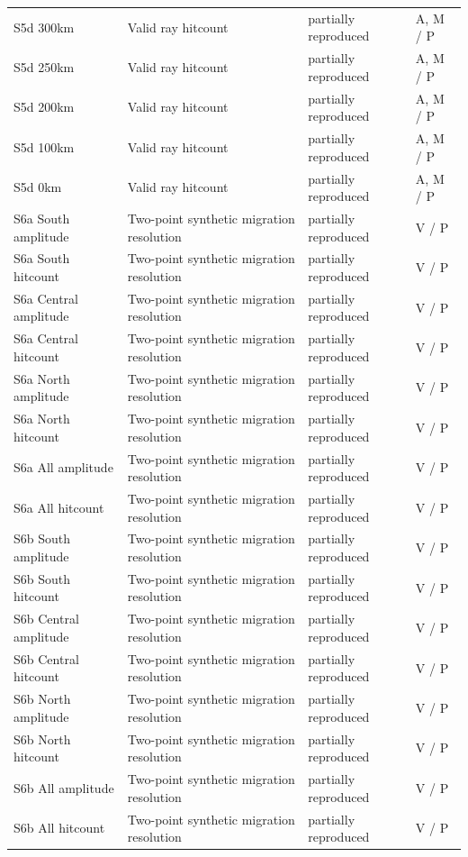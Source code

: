 \documentclass[10pt]{article}
\begin{document}
\begin{longtable}{p{.23\linewidth}p{.25\linewidth}p{.19\linewidth}p{.22\linewidth}}
S5d 300km & Valid ray hitcount & partially reproduced & A, M / P \\
S5d 250km & Valid ray hitcount & partially reproduced & A, M / P \\
S5d 200km & Valid ray hitcount & partially reproduced & A, M / P \\
S5d 100km & Valid ray hitcount & partially reproduced & A, M / P \\
S5d 0km & Valid ray hitcount & partially reproduced & A, M / P \\
S6a South amplitude & Two-point synthetic migration resolution & partially reproduced & V / P \\
S6a South hitcount & Two-point synthetic migration resolution & partially reproduced & V / P \\
S6a Central amplitude & Two-point synthetic migration resolution & partially reproduced & V / P \\
S6a Central hitcount & Two-point synthetic migration resolution & partially reproduced & V / P \\
S6a North amplitude & Two-point synthetic migration resolution & partially reproduced & V / P \\
S6a North hitcount & Two-point synthetic migration resolution & partially reproduced & V / P \\
S6a All amplitude & Two-point synthetic migration resolution & partially reproduced & V / P \\
S6a All hitcount & Two-point synthetic migration resolution & partially reproduced & V / P \\
S6b South amplitude & Two-point synthetic migration resolution & partially reproduced & V / P \\
S6b South hitcount & Two-point synthetic migration resolution & partially reproduced & V / P \\
S6b Central amplitude & Two-point synthetic migration resolution & partially reproduced & V / P \\
S6b Central hitcount & Two-point synthetic migration resolution & partially reproduced & V / P \\
S6b North amplitude & Two-point synthetic migration resolution & partially reproduced & V / P \\
S6b North hitcount & Two-point synthetic migration resolution & partially reproduced & V / P \\
S6b All amplitude & Two-point synthetic migration resolution & partially reproduced & V / P \\
S6b All hitcount & Two-point synthetic migration resolution & partially reproduced & V / P \\

\end{longtable}
\end{document}
